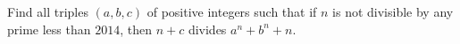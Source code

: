 Find all triples $(a,b,c)$ of positive integers such that if $n$ is not divisible by any prime less than $2014$, then $n+c$ divides $a^n + b^n + n$.
